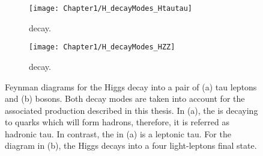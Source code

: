 \begin{figure}
\centering
\begin{subfigure}{.45\textwidth}
  \centering
  \texttt{[image: Chapter1/H\_decayModes\_Htautau]}
  \caption{\Htautau decay.}
  \label{fig:Chap1:Higgs:DecayModes:Htautau}
\end{subfigure}%
\begin{subfigure}{.4\textwidth}
  \centering
  \texttt{[image: Chapter1/H\_decayModes\_HZZ]}
  \caption{\HZZ decay.}
  \label{fig:Chap1:Higgs:DecayModes:HZZ}
\end{subfigure}
\caption{Feynman diagrams for the Higgs decay into a pair of (a) tau leptons and (b)  \PZ bosons. 
Both decay modes are taken into account for the associated \tHq production described in this thesis.
In (a), the \APtauon is decaying to quarks which will form hadrons, 
  therefore, it is referred as hadronic tau. In contrast, the \Ptauon in (a) is a leptonic tau. 
  For the diagram in (b), the Higgs decays into a four light-leptons final state.}
\label{fig:Chap1:Higgs:DecayModes}
\end{figure}



